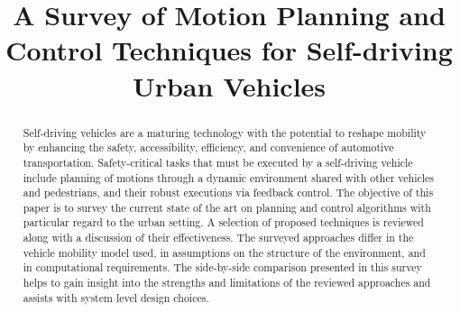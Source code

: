 \documentclass[a4paper,10pt]{article}
\title{A Survey of Motion Planning and Control Techniques for Self-driving Urban Vehicles}
\begin{document}
\maketitle

\begin{abstract}
Self-driving vehicles are a maturing technology with the potential to reshape mobility by enhancing the safety, accessibility, efficiency, and convenience of automotive transportation. Safety-critical tasks that must be executed by a self-driving vehicle include planning of motions through a dynamic environment shared with other vehicles and pedestrians, and their robust executions via feedback control. The objective of this paper is to survey the current state of the art on planning and control algorithms with particular regard to the urban setting. A selection of proposed techniques is reviewed along with a discussion of their effectiveness. The surveyed approaches differ in the vehicle mobility model used, in assumptions on the structure of the environment, and in computational requirements. The side-by-side comparison presented in this survey helps to gain insight into the strengths and limitations of the reviewed approaches and assists with system level design choices.
\end{abstract}
\end{document}
